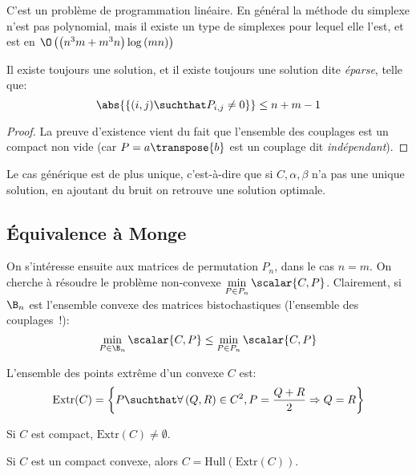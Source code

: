 C'est un problème de programmation linéaire.
En général la méthode du simplexe n'est pas polynomial, mais il existe un type de simplexes pour lequel elle l'est, et est en $\O\left(\left(n^{3}m + m^{3}n\right)\log\left(mn\right)\right)$

\begin{proposition}
	Il existe toujours une solution, et il existe toujours une solution dite \emph{éparse}, telle que:
	\begin{equation*}
		\abs{\left\{(i, j) \suchthat P_{i, j}\neq 0\right\}} \leq n + m - 1
	\end{equation*}
\end{proposition}
\begin{proof}
	La preuve d'existence vient du fait que l'ensemble des couplages est un compact non vide (car $P = a\transpose{b}$ est un couplage dit \emph{indépendant}).
\end{proof}
Le cas générique est de plus unique, c'est-à-dire que si $C, \alpha, \beta$ n'a pas une unique solution, en ajoutant du bruit on retrouve une solution optimale.

\subsection{Équivalence à Monge}

On s'intéresse ensuite aux matrices de permutation $P_{n}$, dans le cas $n = m$.
On cherche à résoudre le problème non-convexe $\displaystyle\min_{P\in P_{n}} \scalar{C, P}$.
Clairement, si $\B_{n}$ est l'ensemble convexe des matrices bistochastiques (l'ensemble des couplages~!):
\begin{equation*}
	\min_{P \in \B_{n}} \scalar{C, P} \leq \min_{P \in P_{n}}\scalar{C, P}
\end{equation*}

\begin{definition}
	L'ensemble des points extrême d'un convexe $C$ est:
	\begin{equation*}
		\mathrm{Extr}(C) = \left\{P \suchthat \forall \left(Q, R\right) \in C^{2}, P = \frac{Q + R}{2} \Rightarrow Q = R\right\}
	\end{equation*}
\end{definition}

\begin{thm}
	Si $C$ est compact, $\mathrm{Extr}(C) \neq \emptyset$.
\end{thm}

\begin{thm}
	Si $C$ est un compact convexe, alors $C = \mathrm{Hull}\left(\mathrm{Extr}\left(C\right)\right)$.
\end{thm}


